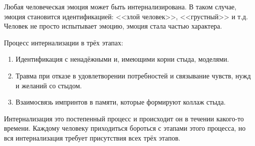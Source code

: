 \documentclass[10pt, fleqn]{article}
\begin{document}

Любая человеческая эмоция может быть интернализирована. В таком случае, эмоция становится идентификацией: <<злой человек>>, <<грустный>> и т.д. Человек не просто испытывает эмоцию, эмоция стала частью характера.

Процесс интернализации в трёх этапах:
\begin{enumerate}
\item Идентификация с ненадёжными и, имеющими корни стыда, моделями.
\item Травма при отказе в удовлетворении потребностей и связывание чувств, нужд и желаний со стыдом.
\item Взаимосвязь импринтов в памяти, которые формируют коллаж стыда.
\end{enumerate}

Интернализация это постепенный процесс и происходит он в течении какого-то времени. Каждому человеку приходиться бороться с этапами этого процесса, но вся интернализация требует присутствия всех трёх этапов.
\end{document}
